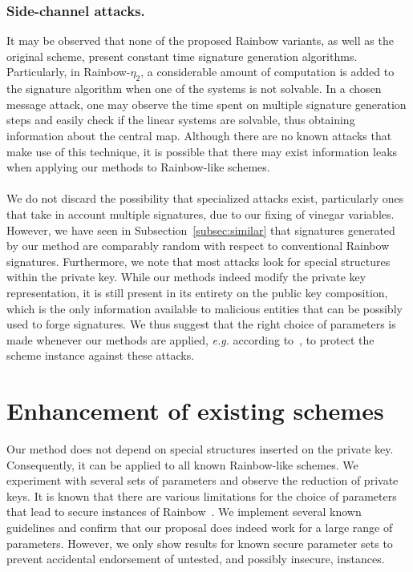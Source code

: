 \documentclass[draft, 12pt, a4paper, oneside]{memoir}
\theoremstyle{definition}
\theoremstyle{remark}
\begin{document}
\subsubsection{Side-channel attacks.} It may be observed that none of the
proposed Rainbow variants, as well as the original scheme, present constant
time signature generation algorithms. Particularly, in Rainbow-$\eta_2$, a
considerable amount of computation is added to the signature algorithm when one
of the systems is not solvable. In a chosen message attack, one may observe the
time spent on multiple signature generation steps and easily check if the
linear systems are solvable, thus obtaining information about the central map.
Although there are no known attacks that make use of this technique, it is
possible that there may exist information leaks when applying our methods to
Rainbow-like schemes.

\paragraph{} We do not discard the possibility that specialized attacks exist,
particularly ones that take in account multiple signatures, due to our fixing
of vinegar variables. However, we have seen in Subsection~\ref{subsec:similar}
that signatures generated by our method are comparably random with respect to
conventional Rainbow signatures. Furthermore, we note that most attacks look
for special structures within the private key. While our methods indeed modify
the private key representation, it is still present in its entirety on the
public key composition, which is the only information available to malicious
entities that can be possibly used to forge signatures. We thus suggest that
the right choice of parameters is made whenever our methods are applied,
\emph{e.g.} according to~\cite{Petzoldt:201005}, to protect the scheme
instance against these attacks.

\section{Enhancement of existing schemes}\label{sec:experiments}

Our method does not depend on special structures inserted on the private key.
Consequently, it can be applied to all known Rainbow-like schemes. We
experiment with several sets of parameters and observe the reduction of private
keys. It is known that there are various limitations for the choice of
parameters that lead to secure instances of
Rainbow~\cite{Petzoldt:201005}. We implement several known guidelines
and confirm that our proposal does indeed work for a large range of parameters.
However, we only show results for known secure parameter sets to prevent
accidental endorsement of untested, and possibly insecure, instances.
\end{document}
